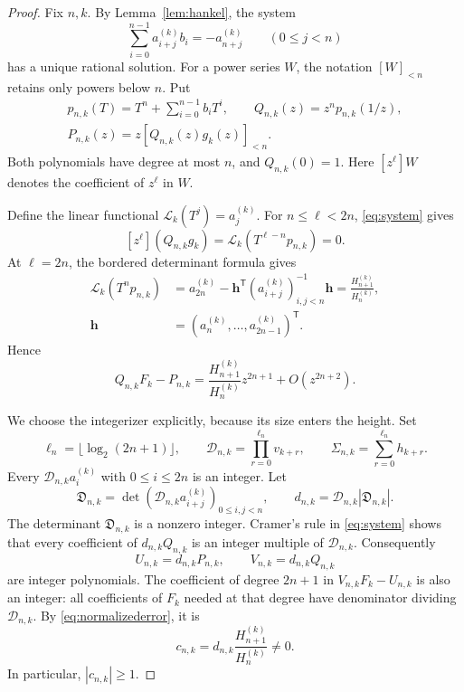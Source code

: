 \documentclass{amsart}
\numberwithin{equation}{section}
\begin{document}
\begin{proof}
Fix $n,k$. By Lemma~\ref{lem:hankel}, the system
\begin{equation}\label{eq:system}
\sum_{i=0}^{n-1}a_{i+j}^{(k)}b_i=-a_{n+j}^{(k)}
\qquad(0\le j<n)
\end{equation}
has a unique rational solution. For a power series $W$, the notation
$[W]_{<n}$ retains only powers below $n$. Put
\begin{gather}
p_{n,k}(T)=T^n+\sum_{i=0}^{n-1}b_iT^i,\qquad
Q_{n,k}(z)=z^np_{n,k}(1/z),\label{eq:pQ}\\
P_{n,k}(z)=z[Q_{n,k}(z)g_k(z)]_{<n}.\label{eq:Ptrunc}
\end{gather}
Both polynomials have degree at most $n$, and $Q_{n,k}(0)=1$.
Here $[z^\ell]W$ denotes the coefficient of $z^\ell$ in $W$.

Define the linear functional $\mathcal L_k(T^j)=a_j^{(k)}$.
For $n\le\ell<2n$, \eqref{eq:system} gives
\[
[z^\ell](Q_{n,k}g_k)=\mathcal L_k(T^{\ell-n}p_{n,k})=0.
\]
At $\ell=2n$, the bordered determinant formula gives
\begin{equation}\label{eq:schur}
\begin{split}
\mathcal L_k(T^np_{n,k})
 &=a_{2n}^{(k)}-\boldsymbol h^{\mathsf T}
       (a_{i+j}^{(k)})_{i,j<n}^{-1}\boldsymbol h
 =\frac{H_{n+1}^{(k)}}{H_n^{(k)}},\\
\boldsymbol h&=(a_n^{(k)},\ldots,a_{2n-1}^{(k)})^{\mathsf T}.
\end{split}
\end{equation}
Hence
\begin{equation}\label{eq:normalizederror}
Q_{n,k}F_k-P_{n,k}
 =\frac{H_{n+1}^{(k)}}{H_n^{(k)}}z^{2n+1}+O(z^{2n+2}).
\end{equation}

We choose the integerizer explicitly, because its size enters the
height. Set
\begin{equation}\label{eq:localwindow}
\ell_n=\lfloor\log_2(2n+1)\rfloor,\qquad
\mathcal D_{n,k}=\prod_{r=0}^{\ell_n}v_{k+r},\qquad
\Sigma_{n,k}=\sum_{r=0}^{\ell_n}h_{k+r}.
\end{equation}
Every $\mathcal D_{n,k}a_i^{(k)}$ with $0\le i\le2n$ is an
integer. Let
\begin{equation}\label{eq:integerizer}
\mathfrak D_{n,k}
 =\det(\mathcal D_{n,k}a_{i+j}^{(k)})_{0\le i,j<n},\qquad
 d_{n,k}=\mathcal D_{n,k}|\mathfrak D_{n,k}|.
\end{equation}
The determinant $\mathfrak D_{n,k}$ is a nonzero integer.
Cramer's rule in \eqref{eq:system} shows that every coefficient of
$d_{n,k}Q_{n,k}$ is an integer multiple of $\mathcal D_{n,k}$.
Consequently
\begin{equation}\label{eq:integerpolys}
U_{n,k}=d_{n,k}P_{n,k},\qquad
V_{n,k}=d_{n,k}Q_{n,k}
\end{equation}
are integer polynomials. The coefficient of degree $2n+1$ in
$V_{n,k}F_k-U_{n,k}$ is also an integer: all coefficients of $F_k$
needed at that degree have denominator dividing $\mathcal D_{n,k}$.
By \eqref{eq:normalizederror}, it is
\begin{equation}\label{eq:c}
c_{n,k}=d_{n,k}\frac{H_{n+1}^{(k)}}{H_n^{(k)}}\ne0.
\end{equation}
In particular, $|c_{n,k}|\ge1$.


\end{proof}
\end{document}
